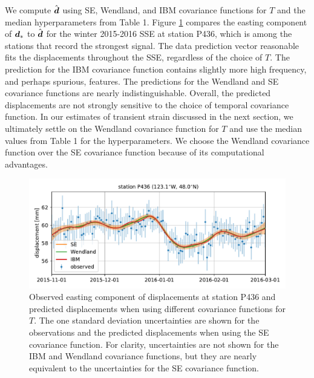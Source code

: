 \documentclass[extra,mreferee]{gji}
\begin{document}
We compute $\hat{\mitbf{d}}$ using SE, Wendland, and IBM covariance functions for $T$ and the median hyperparameters from Table 1. Figure \ref{fig:Fit} compares the easting component of $\mitbf{d}_*$ to $\hat{\mitbf{d}}$ for the winter 2015-2016 SSE at station P436, which is among the stations that record the strongest signal. The data prediction vector reasonable fits the displacements throughout the SSE, regardless of the choice of $T$. The prediction for the IBM covariance function contains slightly more high frequency, and perhaps spurious, features. The predictions for the Wendland and SE covariance functions are nearly indistinguishable. Overall, the predicted displacements are not strongly sensitive to the choice of temporal covariance function. In our estimates of transient strain discussed in the next section, we ultimately settle on the Wendland covariance function for $T$ and use the median values from Table 1 for the hyperparameters. We choose the Wendland covariance function over the SE covariance function because of its computational advantages.     

\begin{figure}
\includegraphics{figures/signal_fit/signal-fit.pdf}
\caption{Observed easting component of displacements at station P436 and predicted displacements when using different covariance functions for $T$. The one standard deviation uncertainties are shown for the observations and the predicted displacements when using the SE covariance function. For clarity, uncertainties are not shown for the IBM and Wendland covariance functions, but they are nearly equivalent to the uncertainties for the SE covariance function.}   
\label{fig:Fit}
\end{figure}
\end{document}
